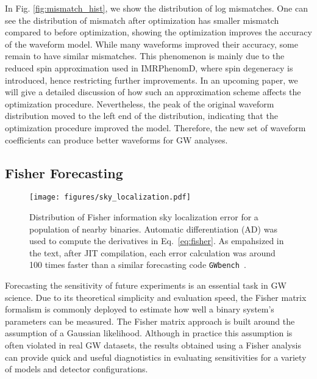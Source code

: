 \documentclass[twocolumn]{aastex631}
\begin{document}
In Fig. \ref{fig:mismatch_hist}, we show the distribution of log mismatches.
One can see the distribution of mismatch after optimization has smaller mismatch compared to before optimization,
showing the optimization improves the accuracy of the waveform model.
While many waveforms improved their accuracy, some remain to have similar mismatches. This phenomenon is mainly due to the reduced spin approximation used in IMRPhenomD, where spin degeneracy is introduced, hence restricting further improvements. In an upcoming paper, we will give a detailed discussion of how such an approximation scheme affects the optimization procedure. 
Nevertheless, the peak of the original waveform distribution moved to the left end of the distribution, indicating that the optimization procedure improved the model. 
Therefore, the new set of waveform coefficients can produce better waveforms for GW analyses. 

\subsection{Fisher Forecasting}
\label{subsec:fisher}

\begin{figure}[t!]
    \centering
    \texttt{[image: figures/sky\_localization.pdf]}
    \caption{
        Distribution of Fisher information sky localization error for a population of nearby binaries.
        Automatic differentiation (AD) was used to compute the derivatives in Eq.~\ref{eq:fisher}.
        As empahsized in the text, after JIT compilation, each error calculation was around 100 times faster than a similar forecasting code \texttt{GWbench}~\citep{Borhanian:2020ypi}.
    }
    \label{fig:sky_localization}
\end{figure}

Forecasting the sensitivity of future experiments is an essential task in GW science.
Due to its theoretical simplicity and evaluation speed, the Fisher matrix formalism is commonly deployed to estimate how well a binary system's parameters can be measured.
The Fisher matrix approach is built around the assumption of a Gaussian likelihood.
Although in practice this assumption is often violated in real GW datasets, the results obtained using a Fisher analysis can provide quick and useful diagnotistics in evaluating sensitivities for a variety of models and detector configurations.
\end{document}

